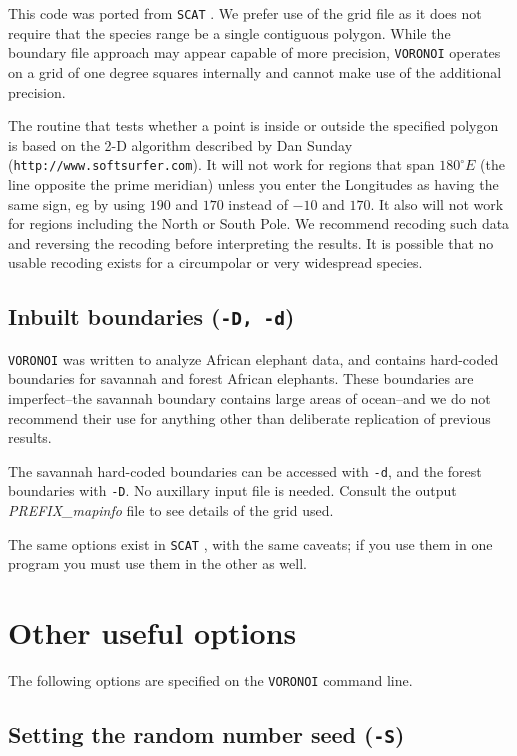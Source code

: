 \documentclass[10pt,titlepage,times,letterpaper]{article}
\def\SCAT{{\tt SCAT} }
\def\VORONOI{{\tt VORONOI} }
\begin{document}
This code was ported from \SCAT.  We prefer use of the grid file as it does not
require that the species range be a single contiguous polygon.  While the boundary
file approach may appear capable of more precision, \VORONOI operates on a grid of
one degree squares internally and cannot make use of the additional precision.

The routine that tests whether a point is inside or outside
the specified polygon is based on the 2-D algorithm 
described by Dan Sunday ({\tt http://www.softsurfer.com}). 
It will not work for regions that span
$180^\circ E$ (the line opposite the prime meridian) unless you enter
the Longitudes as having the same sign, eg by using $190$ and $170$
instead of $-10$ and $170$. It also will not work for regions
including the North or South Pole.   We recommend recoding such
data and reversing the recoding before interpreting the results.  It
is possible that no usable recoding exists for a circumpolar or very widespread species.

\subsection{Inbuilt boundaries ({\tt -D, -d})}

\VORONOI was written to analyze African elephant data, and contains hard-coded
boundaries for savannah and forest African elephants.  These boundaries are 
imperfect--the savannah boundary contains large areas of ocean--and we do not
recommend their use for anything other than deliberate replication of previous results.

The savannah hard-coded boundaries can be accessed with {\tt -d}, and the 
forest boundaries with {\tt -D}.  No auxillary input file is needed.  Consult
the output {\it PREFIX\_mapinfo} file to see details of the grid used.

The same options exist in \SCAT, with the same caveats; if you use them in one
program you must use them in the other as well.

\section{Other useful options}

The following options are specified on the \VORONOI command line.

\subsection{Setting the random number seed  ({\tt -S})}
\end{document}
